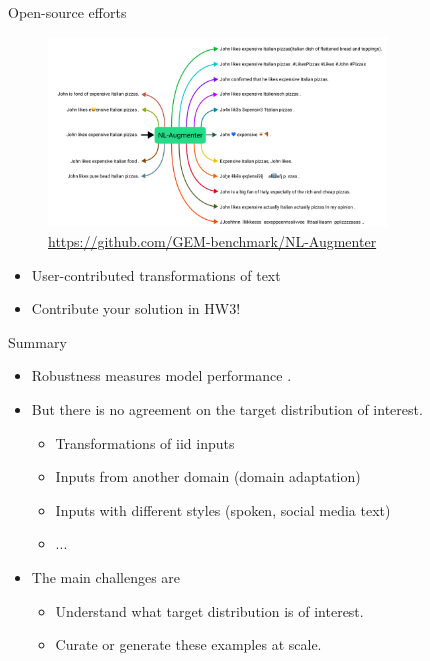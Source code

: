 \documentclass[usenames,dvipsnames,notes,11pt,aspectratio=169,hyperref={colorlinks=true, linkcolor=blue}]{beamer}
\begin{document}
\begin{frame}
    {Open-source efforts}
    \begin{figure}
        \includegraphics[width=0.8\textwidth]{figures/nl-augmenter}
        \caption{\url{https://github.com/GEM-benchmark/NL-Augmenter}}
    \end{figure}
    \vspace{-2em}
    \begin{itemize}
        \item User-contributed transformations of text
        \item Contribute your solution in HW3!
    \end{itemize}
\end{frame}

\begin{frame}
    {Summary}

    \begin{itemize}
        \item Robustness measures model performance .
        \item But there is no agreement on the target distribution of interest.
            \begin{itemize}
                \item Transformations of iid inputs
                \item Inputs from another domain (domain adaptation)
                \item Inputs with different styles (spoken, social media text)
                \item ...
            \end{itemize}
            \pause
        \item The main challenges are
            \begin{itemize}
                \item Understand what target distribution is of interest.
                \item Curate or generate these examples at scale. 
            \end{itemize}
    \end{itemize}
\end{frame}
\end{document}
